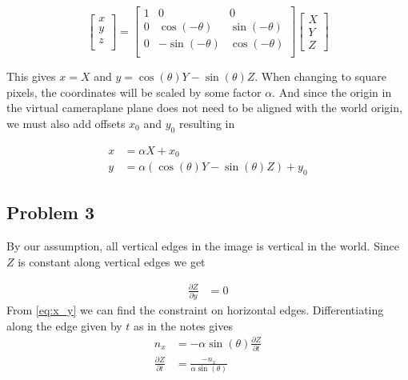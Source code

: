 \documentclass{article}
\begin{document}
\begin{equation}
	\begin{bmatrix}
		x \\
		y \\
		z \\
	\end{bmatrix}
	=
	\begin{bmatrix}
		1 & 0 & 0\\
		0 & \cos(-\theta) & \sin(-\theta)\\
		0 & -\sin(-\theta) & \cos(-\theta)\\
	\end{bmatrix}
	\begin{bmatrix}
		X \\ Y \\ Z
	\end{bmatrix}
\end{equation}

This gives $x=X$ and $y=\cos(\theta)Y - \sin(\theta)Z$. When changing to square pixels, the coordinates will be scaled by some factor $\alpha$. And since the origin in the virtual cameraplane plane does not need to be aligned with the world origin, we must also add offsets $x_0$ and $y_0$ resulting in

\begin{equation}
\begin{split}
	x &= \alpha X + x_0 \\
	y &= \alpha(\cos(\theta)Y - \sin(\theta)Z) + y_0
\end{split}
\label{eq:x_y}
\end{equation}

\subsection*{Problem 3}

By our assumption, all vertical edges in the image is vertical in the world. Since $Z$ is constant along vertical edges we get

\begin{equation}
\begin{split}
	\frac{\partial Z}{\partial y} &= 0
\end{split}
\end{equation}
From \cref{eq:x_y} we can find the constraint on horizontal edges. Differentiating along the edge given by $t$ as in the notes gives
\begin{equation}
\begin{split}
	n_x &= -\alpha \sin(\theta) \frac{\partial Z}{\partial t}\\
	\frac{\partial Z}{\partial t} &= \frac{-n_x}{\alpha\sin(\theta)}
\end{split}
\end{equation}
\end{document}
